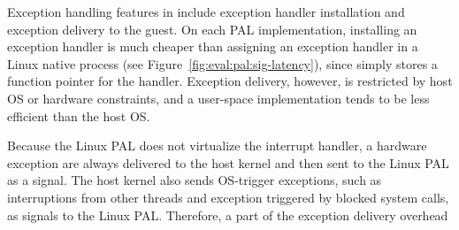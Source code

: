 


\begin{figure*}[t!]
\centering
\footnotesize
{}
\caption{Latency of (a) installing an exception handler; (b)
interrupting a running thread with signals (on Linux) or  on the PALs; (c) catching a memory protection fault. Lower is better. The comparison is between (1) signals on Linux; (2) the Linux PAL, with and without a \seccomp{} filter ({\bf +SC}) and reference monitor ({\bf +RM}); (3) the \sgx{} PAL.}
\label{fig:eval:pal:sig-latency}
\end{figure*}




Exception handling features in \thehostabi{} include
exception handler installation
and exception delivery to the guest.
On each PAL implementation,
installing an exception handler is much cheaper than assigning an exception handler
in a Linux native process
(see Figure~\ref{fig:eval:pal:sig-latency}),
since \thehostabi{} simply stores a function pointer for the handler.
Exception delivery, however,
is restricted by host OS or hardware constraints,
and a user-space
implementation tends to be less efficient
than the host OS.



Because the Linux PAL does not virtualize
the interrupt handler,
a hardware exception are always delivered
to the host kernel and then sent to the Linux PAL as a signal.
The host kernel
also sends
OS-trigger exceptions,
such as interruptions from other threads
and exception
triggered by blocked system calls,
as signals to the Linux PAL.
Therefore, a part of the exception delivery overhead 




